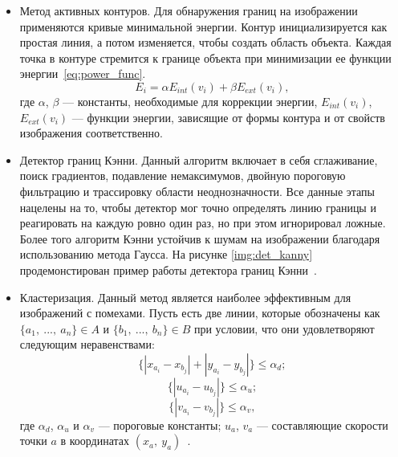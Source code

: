 \begin{itemize}[label=---]
    \item Метод активных контуров. Для обнаружения границ на изображении применяются кривые минимальной энергии. Контур инициализируется как простая линия, а потом изменяется, чтобы создать область объекта. Каждая точка в контуре стремится к границе объекта при минимизации ее функции энергии~\ref{eq:power_func}.
    \begin{equation}
    \label{eq:power_func}
        E_i = \alpha E_{int}(v_i) + \beta E_{ext}(v_i),
    \end{equation}
    где $\alpha$, $\beta$ --- константы, необходимые для коррекции энергии, $E_{int}(v_i)$, $E_{ext}(v_i)$ --- функции энергии, зависящие от формы контура и от свойств изображения соответственно.
    \item Детектор границ Кэнни. Данный алгоритм включает в себя сглаживание, поиск градиентов, подавление немаксимумов, двойную пороговую фильтрацию и трассировку области неоднозначности. Все данные этапы нацелены на то, чтобы детектор мог точно определять линию границы и реагировать на каждую ровно один раз, но при этом игнорировал ложные. Более того алгоритм Кэнни устойчив к шумам на изображении благодаря использованию метода Гаусса. На рисунке \ref{img:det_kanny} продемонстирован пример работы детектора границ Кэнни~\cite{border}.
    \item Кластеризация. Данный метод является наиболее эффективным для изображений с помехами. Пусть есть две линии, которые обозначены как $\{a_1,~...,~a_n\}\in A$ и $\{b_1,~...,~b_n\}\in B$ при условии, что они удовлетворяют следующим неравенствами:
    \begin{equation}
    \label{eq:func_1}
        \{|x_a_i - x_b_j| + |y_a_i - y_b_j|\} \leq \alpha_d;
    \end{equation}
    \begin{equation}
    \label{eq:func_2}
        \{|u_a_i - u_b_j|\} \leq \alpha_u;
    \end{equation}
    \begin{equation}
    \label{eq:func_1}
        \{|v_a_i - v_b_j|\} \leq \alpha_v,
    \end{equation}
    где $\alpha_d$, $\alpha_u$ и $\alpha_v$ --- пороговые константы; $u_a$, $v_a$ --- составляющие скорости точки $a$ в координатах $(x_a,~y_a)$~\cite{border}.
\end{itemize}

